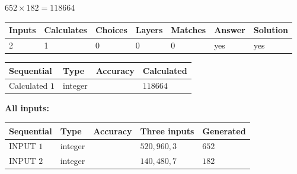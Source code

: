 \documentclass{ctexart}
\begin{document}
 

$ %
652 \times  %
182=   %
118664$
 
 
\noindent{}
 
 

 
   
   
   
   
\noindent\begin{tabular}{|l|l|l|l|l|l|l|}
 \hline
Inputs & Calculates & Choices & Layers & Matches & Answer & Solution \\ \hline
 2  & 
 1  & 
 0
  & 
 0  & 
 0  & 
  yes & 
  yes 
  \\ \hline
 \end{tabular}
   
   
   
   
\noindent{}
   
   
  
  
\noindent\begin{tabular}{|l|l|l|l|}
\hline
 Sequential & Type & Accuracy & Calculated \\ 
\hline
 
 
  Calculated $  1 $ & integer &  & 
  $ 118664 $ 
 \\  \hline  
 \end{tabular}
   
   
   
   
\noindent\vspace{0.1in}\hspace{-0.08in} {\textbf{\Large{All inputs: }}}
   
   
  
  
\noindent\begin{tabular}{|l|l|l|l|l|}
\hline
 Sequential & Type & Accuracy & Three inputs & Generated \\ 
\hline
 
 
  INPUT $  1 $ & integer &  & $
 520
 , 
 960
 , 
 3
 $ & $ 652 $ 
 \\  \hline  
 
 
  INPUT $  2 $ & integer &  & $
 140
 , 
 480
 , 
 7
 $ & $ 182 $ 
 \\  \hline  
 \end{tabular}
   
   
   
   
   
   
 \vspace{0.2in}
 
\end{document}

